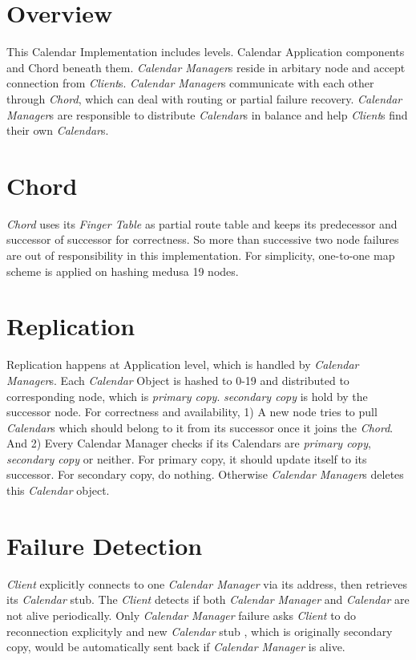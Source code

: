 \documentclass[a4paper, 12pt]{article}
\begin{document}
\section{Overview}
This Calendar Implementation includes levels. Calendar Application
components and Chord beneath them. {\it Calendar Manager}s reside in
arbitary node and accept connection from {\it Client}s. {\it Calendar
  Manager}s communicate with each other through {\it Chord}, which can
deal with routing or partial failure recovery. {\it Calendar Manager}s
are responsible to distribute {\it Calendar}s in balance and help {\it
  Client}s find their own {\it Calendar}s. 


\section{Chord}

{\it Chord} uses its {\it Finger Table} as partial route table and
keeps its predecessor and successor of successor for correctness. So
more than successive two node failures are out of responsibility in
this implementation. For simplicity, one-to-one map scheme is applied
on hashing medusa 19 nodes. 


\section{Replication}
Replication happens at Application level, which is handled by {\it
  Calendar Manager}s. Each {\it Calendar} Object is hashed to 0-19 and
distributed to corresponding node, which is {\it primary copy}. {\it
  secondary copy} is hold by the successor node. For correctness and
availability, 1) A new node tries to pull {\it Calendar}s which should
belong to it from its successor once it joins the {\it Chord}. And 2)
Every Calendar Manager checks if its Calendars are {\it primary copy},
{\it secondary copy} or neither. For primary copy, it should update
itself to its successor. For secondary copy, do nothing. Otherwise
{\it Calendar Manager}s deletes this {\it Calendar} object. 


\section{Failure Detection}
{\it Client} explicitly connects to one {\it Calendar Manager} via its
address, then retrieves its {\it Calendar} stub. The {\it Client}
detects if both {\it Calendar Manager} and {\it Calendar} are not
alive periodically. Only {\it Calendar Manager} failure asks {\it
  Client} to do reconnection explicityly and new {\it Calendar} stub
, which is originally secondary copy, would be automatically sent back
if {\it Calendar Manager} is alive. 
\end{document}
